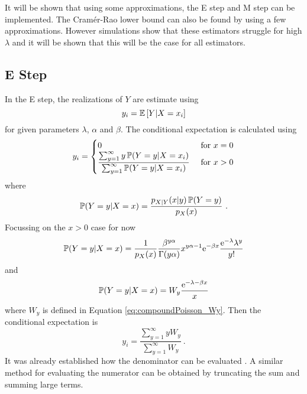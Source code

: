 It will be shown that using some approximations, the E step and M step can be implemented. The Cram\'er-Rao lower bound \citep{rao1945information} \citep{cramer1946mathematical} can also be found by using a few approximations. However simulations show that these estimators struggle for high $\lambda$ and it will be shown that this will be the case for all estimators.

\subsection{E Step}

In the E step, the realizations of $Y$ are estimate using
\begin{equation}
	y_i =
	\operatorname{\mathbb{E}}\left[
		Y|X=x_i
	\right]
\end{equation}
for given parameters $\lambda$, $\alpha$ and $\beta$. The conditional expectation is calculated using
\begin{equation}
	y_i = 
	\begin{cases}
		0 & \text{ for } x=0 \\ 
		\dfrac{\sum_{y=1}^\infty y \operatorname{\mathbb{P}}(Y=y|X=x_i)}{\sum_{y=1}^\infty \operatorname{\mathbb{P}}(Y=y|X=x_i)} & \text{ for } x>0
	\end{cases}
\end{equation}
where
\begin{equation*}
	\operatorname{\mathbb{P}}(Y=y|X=x) = \frac{p_{X|Y}(x|y)\operatorname{\mathbb{P}}(Y=y)}{p_X(x)}
	\ .
\end{equation*}
Focussing on the $x>0$ case for now
\begin{equation*}
	\operatorname{\mathbb{P}}(Y=y|X=x) = \frac{1}{p_X(x)}\frac{\beta^{y\alpha}}{\Gamma(y\alpha)}x^{y\alpha-1}\mathrm{e}^{-\beta x}\frac{\mathrm{e}^{-\lambda}\lambda^y}{y!}
\end{equation*}
and
\begin{equation}
	\operatorname{\mathbb{P}}(Y=y|X=x) = W_y \frac{\mathrm{e}^{-\lambda-\beta x}}{x}
\end{equation}
where $W_y$ is defined in Equation \eqref{eq:compoundPoisson_Wy}.
Then the conditional expectation is
\begin{equation}
	y_i = \frac{\sum_{y=1}^\infty y W_y}{\sum_{y=1}^\infty W_y}
	\ .
\end{equation}
It was already established how the denominator can be evaluated \citep{dunn2005series}. A similar method for evaluating the numerator can be obtained by truncating the sum and summing large terms.


